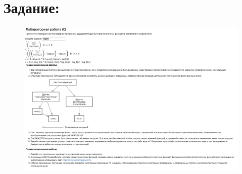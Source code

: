 \documentclass[12pt,onecolumn]{article}
\begin{document}
\section*{Задание:}
\begin{figure}[H]
    \centering
    \includegraphics[width=\textwidth]{image/task.png}
\end{figure}
\end{document}
